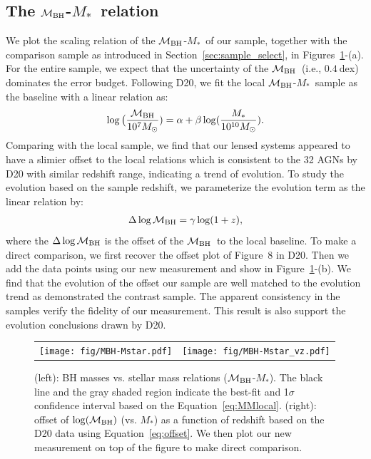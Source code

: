 \documentclass[fleqn,usenatbib]{mnras}
\newcommand{\mbh}{$\mathcal M_{\rm BH}$}
\newcommand{\mstar}{{$M_*$}}
\begin{document}
\subsection{The \mbh-\mstar\ relation}\label{sec:relation}
We plot the scaling relation of the \mbh-\mstar\ of our sample, together with the comparison sample as introduced in Section~\ref{sec:sample_select}, in Figures~\ref{fig:scaling_relation}-(a). For the entire sample, we expect that the uncertainty of the \mbh\ (i.e., $0.4~$dex) dominates the error budget. Following D20, we fit the local \mbh-\mstar\ sample as the baseline with a linear relation as:
\begin{eqnarray}
\label{eq:MMlocal}
\log \big( \frac{\mathcal M_{\rm BH}}{10^{7}M_{\odot}})= \alpha + \beta \log(\frac{M_*}{10^{10}M_{\odot}}).
\end {eqnarray}
Comparing with the local sample, we find that our lensed systems appeared to have a slimier offset to the local relations which is consistent to the 32 AGNs by D20 with similar redshift range, indicating a trend of evolution. To study the evolution based on the sample redshift, we parameterize the evolution term as the linear relation by:
\begin{eqnarray}
\label{eq:offset}
\Delta \log \mathcal M_{\rm BH}= \gamma \log (1 + z),
\end{eqnarray} 
where the $\Delta \log \mathcal M_{\rm BH}$ is the offset of the \mbh\ to the local baseline. To make a direct comparison, we first recover the offset plot of Figure~8 in D20. Then we add the data points using our new measurement and show in Figure~\ref{fig:scaling_relation}-(b). We find that the evolution of the offset our sample are well matched to the evolution trend as demonstrated the contrast sample. %
The apparent consistency in the samples verify the fidelity of our measurement. This result is also support the evolution conclusions drawn by D20.

\begin{figure}
\centering
\begin{tabular}{c c}
{\texttt{[image: fig/MBH-Mstar.pdf]}}&
{\texttt{[image: fig/MBH-Mstar\_vz.pdf]}}\\
\end{tabular}
\caption{\label{fig:scaling_relation} 
(left): BH masses vs. stellar mass relations (\mbh-\mstar). The black line and the gray shaded region indicate the best-fit and 1$\sigma$ confidence interval based on the Equation~\ref{eq:MMlocal}.
(right): offset of $\log(\mathcal M_{\rm BH})$ (vs. \mstar) as a function of redshift based on the D20 data using Equation~\ref{eq:offset}. We then plot our new measurement on top of the figure to make direct comparison. }
\end{figure} 
\end{document}
